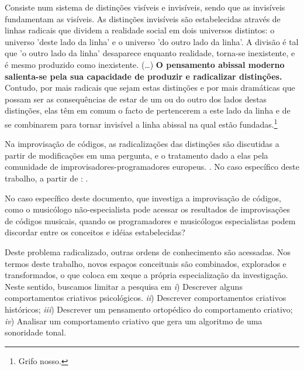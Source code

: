 \begin{citacao}
Consiste num sistema de distinções visíveis e invisíveis, sendo que as invisíveis fundamentam as visíveis. As distinções invisíveis são estabelecidas através de linhas radicais que dividem a realidade social em dois universos distintos: o universo  'deste lado da linha' e o universo 'do outro lado da linha'. A divisão é tal que 'o outro lado da linha' desaparece enquanto realidade, torna-se inexistente, e é mesmo produzido como inexistente. (\ldots) \textbf{O pensamento abissal moderno salienta-se pela sua capacidade de produzir e radicalizar distinções.} Contudo, por mais radicais que sejam estas distinções e por mais dramáticas que possam ser as consequências de estar de um ou do outro dos lados destas distinções, elas têm em comum o facto de pertencerem a este lado da linha e de se combinarem para tornar invisível a linha abissal na qual estão fundadas.\footnote{Grifo nosso.} 
\end{citacao}

Na improvisação de códigos, as radicalizações das distinções são discutidas a partir de modificações em uma pergunta, e o tratamento dado a elas pela comunidade de improvisadores-programadores europeus. \cite{pressing_improvisation_1987}. No caso específico deste trabalho, a partir de : . 

No caso específico deste documento, que investiga a improvisação de códigos, como o musicólogo não-especialista pode acessar os resultados de improvisações de códigos musicais, quando os programadores e musicólogos especialistas podem discordar entre os conceitos e idéias estabelecidas? 

Deste problema radicalizado, outras ordens de conhecimento são acessadas. Nos termos deste trabalho, novos espaços conceituais são combinados, explorados e transformados, o que coloca em xeque a própria especialização da investigação. Neste sentido, buscamos limitar a pesquisa em \emph{i}) Descrever alguns comportamentos criativos psicológicos. \emph{ii}) Descrever comportamentos criativos históricos; \emph{iii}) Descrever um pensamento ortopédico do comportamento criativo; \emph{iv}) Analisar um comportamento criativo que gera um algoritmo de uma sonoridade tonal. 

